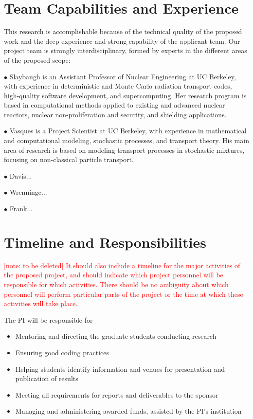\documentclass[12pt]{article}
\begin{document}
\section{Team Capabilities and Experience}

This research is accomplishable because of the technical quality of the proposed work and the deep experience and strong capability of the applicant team.
Our project team is strongly interdisciplinary, formed by experts in the different areas of the proposed scope:

$\bullet$ Slaybaugh is an Assistant Professor of Nuclear Engineering at UC Berkeley, with experience in deterministic and Monte Carlo radiation transport codes, high-quality software development, and supercomputing.
Her research program is based in computational methods applied to existing and advanced nuclear reactors, nuclear non-proliferation and security, and shielding applications. 

$\bullet$ Vasques is a Project Scientist at UC Berkeley, with experience in mathematical and computational modeling, stochastic processes, and transport theory.
His main area of research is based on modeling transport processes in stochastic mixtures, focusing on non-classical particle transport.

$\bullet$ Davis...

$\bullet$ Wrenninge...

$\bullet$ Frank...


\section{Timeline and Responsibilities}

\textcolor{red}{[note: to be deleted] It should also include a timeline for the major activities of the proposed
project, and should indicate which project personnel will be responsible for which activities.
There should be no ambiguity about which personnel will perform particular parts of the project or the time at which these activities will take place.}

The PI will be responsible for
\begin{itemize}[noitemsep]
\item Mentoring and directing the graduate students conducting research
\item Ensuring good coding practices
\item Helping students identify information and venues for presentation and publication of results
\item Meeting all requirements for reports and deliverables to the sponsor
\item Managing and administering awarded funds, assisted by the PI's institution
\end{itemize}
\end{document}
